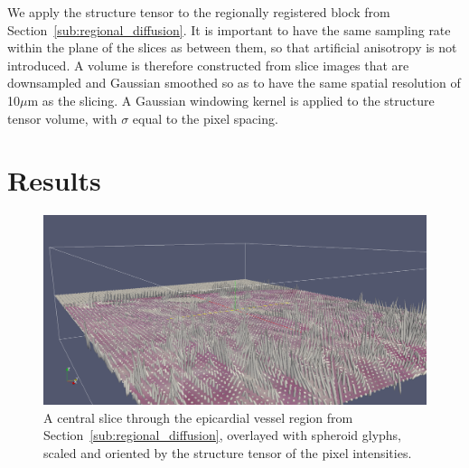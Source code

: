  We apply the structure tensor to the regionally registered block from Section~\ref{sub:regional_diffusion}. It is important to have the same sampling rate within the plane of the slices as between them, so that artificial anisotropy is not introduced. A volume is therefore constructed from slice images that are downsampled and Gaussian smoothed so as to have the same spatial resolution of 10$\mu$m as the slicing. A Gaussian windowing kernel is applied to the structure tensor volume, with $\sigma$ equal to the pixel spacing.

\section{Results} %
\label{sec:results}
  \begin{figure}
    \centering
    \includegraphics[width=\textwidth]{Ch7/Figs/structure_tensor_glyphs}
    \caption{A central slice through the epicardial vessel region from Section~\ref{sub:regional_diffusion}, overlayed with spheroid glyphs, scaled and oriented by the structure tensor of the pixel intensities.}
    \label{fig:structure_tensor_glyphs}
  \end{figure}
  

